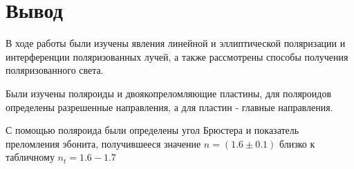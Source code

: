 \section{Вывод}
В ходе работы были изучены явления линейной и эллиптической поляризации и интерференции поляризованных лучей, а также рассмотрены способы получения поляризованного света.

Были изучены поляроиды и двоякопреломляющие пластины, для поляроидов определены разрешенные направления, а для пластин - главные направления.

С помощью поляроида были определены угол Брюстера и показатель преломления эбонита, получившееся значение $n = (1.6 \pm 0.1)$ близко к табличному $n_t = 1.6-1.7$


